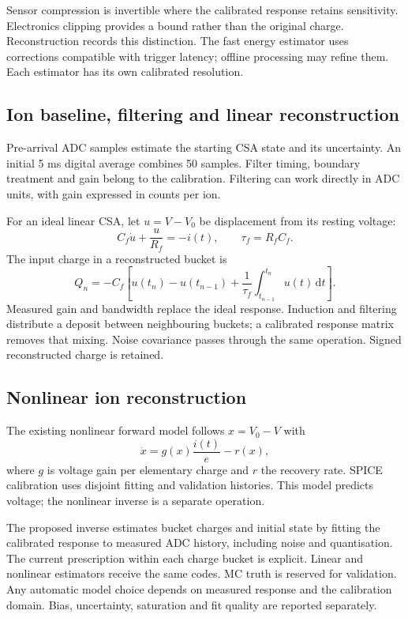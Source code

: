 \documentclass[11pt,a4paper]{article}
\newcommand{\dd}{\mathrm{d}}
\begin{document}
Sensor compression is invertible where the calibrated response retains
sensitivity. Electronics clipping provides a bound rather than the original
charge. Reconstruction records this distinction. The fast energy estimator
uses corrections compatible with trigger latency; offline processing may
refine them. Each estimator has its own calibrated resolution.

\subsection{Ion baseline, filtering and linear reconstruction}
Pre-arrival ADC samples estimate the starting CSA state and its uncertainty.
An initial 5 ms digital average combines 50 samples. Filter timing, boundary
treatment and gain belong to the calibration. Filtering can work directly in
ADC units, with gain expressed in counts per ion.

For an ideal linear CSA, let $u=V-V_0$ be displacement from its resting voltage:
\begin{equation}
 C_f\dot u+\frac{u}{R_f}=-i(t),\qquad \tau_f=R_fC_f.
\end{equation}
The input charge in a reconstructed bucket is
\begin{equation}
 Q_n=-C_f\left[u(t_n)-u(t_{n-1})+
 \frac1{\tau_f}\int_{t_{n-1}}^{t_n}u(t)\,\dd t\right].
\end{equation}
Measured gain and bandwidth replace the ideal response. Induction and
filtering distribute a deposit between neighbouring buckets; a calibrated
response matrix removes that mixing. Noise covariance passes through the
same operation. Signed reconstructed charge is retained.

\subsection{Nonlinear ion reconstruction}
The existing nonlinear forward model follows $x=V_0-V$ with
\begin{equation}
 \dot x=g(x)\frac{i(t)}e-r(x),
\end{equation}
where $g$ is voltage gain per elementary charge and $r$ the recovery rate.
SPICE calibration uses disjoint fitting and validation histories. This model
predicts voltage; the nonlinear inverse is a separate operation.

The proposed inverse estimates bucket charges and initial state by fitting
the calibrated response to measured ADC history, including noise and
quantisation. The current prescription within each charge bucket is explicit.
Linear and nonlinear estimators receive the same codes. MC truth is reserved
for validation. Any automatic model choice depends on measured response and
the calibration domain. Bias, uncertainty, saturation and fit quality are
reported separately.
\end{document}
